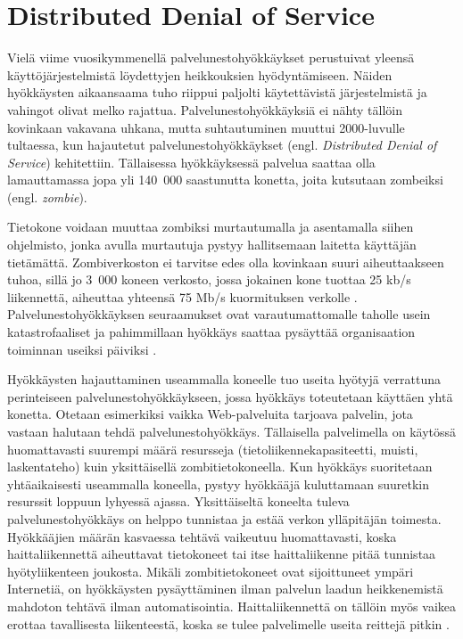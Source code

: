 \section{Distributed Denial of Service}

Vielä viime vuosikymmenellä palvelunestohyökkäykset perustuivat
yleensä käyttöjärjestelmistä löydettyjen heikkouksien
hyödyntämiseen. Näiden hyökkäysten aikaansaama tuho riippui paljolti
käytettävistä järjestelmistä ja vahingot olivat melko
rajattua. Palvelunestohyökkäyksiä ei nähty tällöin kovinkaan vakavana
uhkana, mutta suhtautuminen muuttui 2000-luvulle tultaessa, kun
hajautetut palvelunestohyökkäykset (engl. \textit{Distributed Denial
of Service}) kehitettiin. Tällaisessa hyökkäyksessä palvelua saattaa
olla lamauttamassa jopa yli 140~000 saastunutta konetta, joita
kutsutaan zombeiksi (engl. \textit{zombie}).

Tietokone voidaan muuttaa zombiksi murtautumalla ja asentamalla siihen
ohjelmisto, jonka avulla murtautuja pystyy hallitsemaan laitetta
käyttäjän tietämättä. Zombiverkoston ei tarvitse edes olla kovinkaan
suuri aiheuttaakseen tuhoa, sillä jo 3~000 koneen verkosto, jossa
jokainen kone tuottaa 25 kb/s liikennettä, aiheuttaa yhteensä 75 Mb/s
kuormituksen verkolle \cite{Hacking}.  Palvelunestohyökkäyksen
seuraamukset ovat varautumattomalle taholle usein katastrofaaliset ja
pahimmillaan hyökkäys saattaa pysäyttää organisaation toiminnan
useiksi päiviksi \cite{CERT}.

Hyökkäysten hajauttaminen useammalla koneelle tuo useita hyötyjä
verrattuna perinteiseen palvelunestohyökkäykseen, jossa hyökkäys
toteutetaan käyttäen yhtä konetta. Otetaan esimerkiksi vaikka
Web-palveluita tarjoava palvelin, jota vastaan halutaan tehdä
palvelunestohyökkäys. Tällaisella palvelimella on käytössä
huomattavasti suurempi määrä resursseja (tietoliikennekapasiteetti,
muisti, laskentateho) kuin yksittäisellä zombitietokoneella. Kun
hyökkäys suoritetaan yhtäaikaisesti useammalla koneella, pystyy
hyökkääjä kuluttamaan suuretkin resurssit loppuun lyhyessä
ajassa. Yksittäiseltä koneelta tuleva palvelunestohyökkäys on helppo
tunnistaa ja estää verkon ylläpitäjän toimesta. Hyökkääjien määrän
kasvaessa tehtävä vaikeutuu huomattavasti, koska haittaliikennettä
aiheuttavat tietokoneet tai itse haittaliikenne pitää tunnistaa
hyötyliikenteen joukosta. Mikäli zombitietokoneet ovat sijoittuneet ympäri
Internetiä, on hyökkäysten pysäyttäminen ilman palvelun laadun heikkenemistä
mahdoton tehtävä ilman automatisointia. Haittaliikennettä on tällöin myös
vaikea erottaa tavallisesta liikenteestä, koska se tulee palvelimelle
useita reittejä pitkin \cite{DDOS}.

